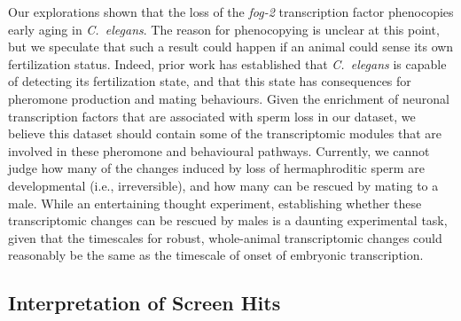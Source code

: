 \documentclass[9pt,twocolumn,twoside]{gsag3jnl}
\newcommand{\cel}{\emph{C.~elegans}}
\newcommand{\fog}{\emph{fog-2}}
\begin{document}
Our explorations shown that the loss of the \fog{} transcription factor phenocopies early aging in \cel{}. The reason for phenocopying is unclear at this point, but we speculate that such a result could happen if an animal could sense its own fertilization status. Indeed, prior work has established that \cel{} is capable of detecting its fertilization state, and that this state has consequences for pheromone production and mating behaviours.
Given the enrichment of neuronal transcription factors that are associated with sperm loss in our dataset, we believe this dataset should contain some of the transcriptomic modules that are involved in these pheromone and behavioural pathways. Currently, we cannot judge how many of the changes induced by loss of hermaphroditic sperm are developmental (i.e., irreversible), and how many can be rescued by mating to a male.
While an entertaining thought experiment, establishing whether these transcriptomic changes can be rescued by males is a daunting experimental task, given that the timescales for robust, whole-animal transcriptomic changes could reasonably be the same as the timescale of onset of embryonic transcription.

\subsection*{Interpretation of Screen Hits}
\label{sub:Interpretation of Screen Hits}






\end{document}
